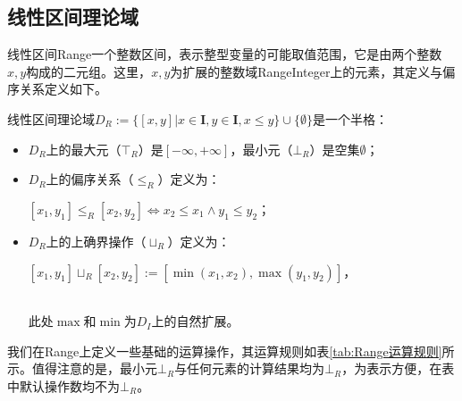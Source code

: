 \subsection{线性区间理论域}
\label{sec:Range}

线性区间Range一个整数区间，表示整型变量的可能取值范围，它是由两个整数$ x, y $构成的二元组。这里，$ x, y $为扩展的整数域RangeInteger上的元素，其定义与偏序关系定义如下。

\begin{definition}
	线性区间理论域$ D_R :=  \{ [x, y] | x \in \mathbf{I}, y \in \mathbf{I}, x \le y \} \cup \{ \emptyset \}$是一个半格：	
	\begin{itemize}
		\item $ D_R $上的最大元（$ \top_R $）是$ [-\infty, +\infty] $，最小元（$ \bot_R $）是空集$ \emptyset $；
		\item $ D_R $上的偏序关系（$ \le_R $）定义为：\\	
		\centerline{$ [x_1, y_1] \le_R [x_2, y_2] \iff x_2 \le x_1 \land y_1 \le y_2 $；}
		\item $ D_R $上的上确界操作（$ \sqcup_R $）定义为：\\	
		\centerline{$ [x_1, y_1] \sqcup_R [x_2, y_2] := [\min(x_1, x_2), \max(y_1, y_2)] $，}  \\
		此处$ \max $和$ \min $为$ D_I $上的自然扩展。
	\end{itemize}
\end{definition}

我们在Range上定义一些基础的运算操作，其运算规则如表\ref{tab:Range运算规则}所示。值得注意的是，最小元$ \bot_R $与任何元素的计算结果均为$ \bot_R $，为表示方便，在表中默认操作数均不为$ \bot_R $。


